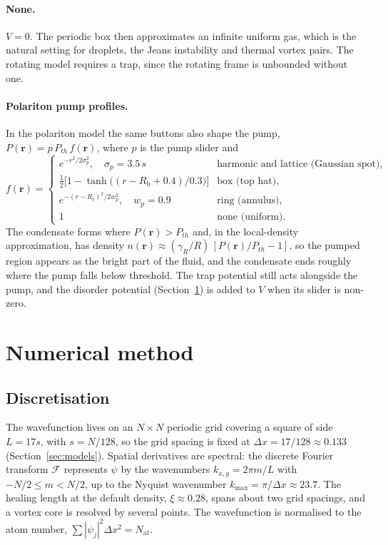\documentclass[11pt,a4paper]{article}
\begin{document}
\paragraph{None.} $V=0$. The periodic box then approximates an infinite uniform gas, which is the natural setting for droplets, the Jeans instability and thermal vortex pairs. The rotating model requires a trap, since the rotating frame is unbounded without one.

\paragraph{Polariton pump profiles.} In the polariton model the same buttons also shape the pump, $P(\mathbf r)=p\,P_{th}\,f(\mathbf r)$, where $p$ is the pump slider and
\begin{equation}
f(\mathbf r)=\begin{cases}
e^{-r^2/2\sigma_p^2},\quad \sigma_p=3.5\,s & \text{harmonic and lattice (Gaussian spot)},\\[2pt]
\tfrac12\bigl[1-\tanh\bigl((r-R_{\mathrm b}+0.4)/0.3\bigr)\bigr] & \text{box (top hat)},\\[2pt]
e^{-(r-R_{\mathrm r})^2/2w_p^2},\quad w_p=0.9 & \text{ring (annulus)},\\[2pt]
1 & \text{none (uniform)}.
\end{cases}
\end{equation}
The condensate forms where $P(\mathbf r)>P_{th}$ and, in the local-density approximation, has density $n(\mathbf r)\approx(\gamma_R/R)\,[P(\mathbf r)/P_{th}-1]$, so the pumped region appears as the bright part of the fluid, and the condensate ends roughly where the pump falls below threshold. The trap potential still acts alongside the pump, and the disorder potential (Section~\ref{sec:numerics}) is added to $V$ when its slider is non-zero.

\section{Numerical method}
\label{sec:numerics}

\subsection{Discretisation}

The wavefunction lives on an $N\times N$ periodic grid covering a square of side $L=17s$, with $s=N/128$, so the grid spacing is fixed at $\Delta x=17/128\approx0.133$ (Section~\ref{sec:models}). Spatial derivatives are spectral: the discrete Fourier transform $\mathcal F$ represents $\psi$ by the wavenumbers $k_{x,y}=2\pi m/L$ with $-N/2\le m<N/2$, up to the Nyquist wavenumber $k_{\max}=\pi/\Delta x\approx23.7$. The healing length at the default density, $\xi\approx0.28$, spans about two grid spacings, and a vortex core is resolved by several points. The wavefunction is normalised to the atom number, $\sum|\psi_j|^2\Delta x^2=N_{\mathrm{at}}$.
\end{document}
